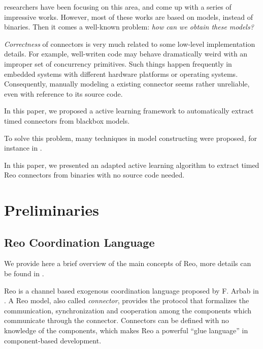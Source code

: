 \documentclass[conference, a4paper]{IEEEtran}
\begin{document}
researchers have been focusing on this area, and come up with a series of impressive works.
However, most of these works are based on models, instead of binaries. Then it comes a well-known
problem: \emph{how can we obtain these models?}

\emph{Correctness} of connectors is very much related to some low-level implementation details.
For example, well-writen code may behave dramatically weird with an improper set of concurrency
primitives. Such things happen frequently in embedded systems with different hardware platforms or
operating systems. Consequently, manually modeling a existing connector seems rather unreliable,
even with reference to its source code.

In this paper, we proposed a active learning framework to automatically extract timed connectors
from blackbox models. 

To solve this problem, many techniques in model constructing were proposed, for instance in
\cite{DBLP:journals/mt/Daelemans10, DBLP:journals/iandc/Angluin87, DBLP:conf/fase/RaffeltS06}.

% 

In this paper, we presented an adapted active learning algorithm to extract timed Reo connectors
from binaries with no source code needed.

\section{Preliminaries} 

\subsection{Reo Coordination Language} 
\label{sec:reo}
We provide here a brief overview of the main concepts of Reo, more details can be found in
\cite{DBLP:journals/mscs/Arbab04, DBLP:journals/scp/BaierSAR06}.

Reo is a channel based exogenous coordination language proposed by F. Arbab in
\cite{DBLP:journals/mscs/Arbab04}. 
A Reo model, also called \emph{connector}, provides the protocol
that formalizes the communication, synchronization and cooperation among the components which
communicate through the connector. Connectors can be defined with no knowledge of the components,
which makes Reo a powerful ``glue language'' in component-based
development\cite{DBLP:journals/sigsoft/Gill03}.
\end{document}
